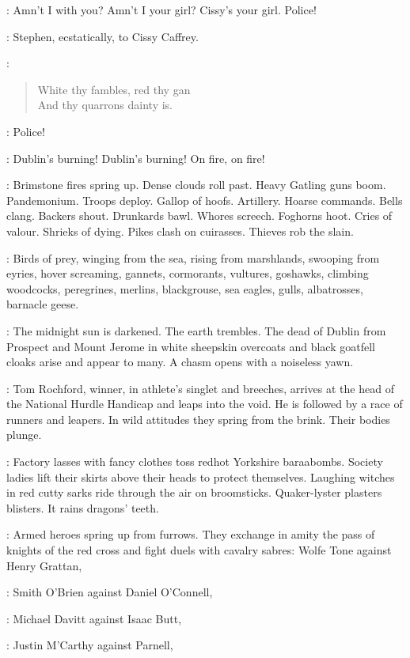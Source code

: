 \Cissy:
Amn't I with you?
Amn't I your girl?
Cissy's your girl.
Police!

:
Stephen, ecstatically, to Cissy Caffrey.

\Stephen:
\begin{verse}
    White thy fambles, red thy gan\\
    And thy quarrons dainty is.
\end{verse}

\Voices:
Police!

\DistantVoices:
Dublin's burning!
Dublin's burning!
On fire, on fire!

:
Brimstone fires spring up.
Dense clouds roll past.
Heavy Gatling guns boom.
Pandemonium.
Troops deploy.
Gallop of hoofs.
Artillery.
Hoarse commands.
Bells clang.
Backers shout.
Drunkards bawl.
Whores screech.
Foghorns hoot.
Cries of valour.
Shrieks of dying.
Pikes clash on cuirasses.
Thieves rob the slain.

:
Birds of prey, winging from the sea,
rising from marshlands, swooping from eyries, hover screaming,
gannets, cormorants, vultures, goshawks, climbing woodcocks, peregrines,
merlins, blackgrouse, sea eagles, gulls, albatrosses, barnacle geese.

:
The midnight sun is darkened.
The earth trembles.
The dead of Dublin from Prospect and Mount Jerome
in white sheepskin overcoats and black goatfell cloaks
arise and appear to many.
A chasm opens with a noiseless yawn.

:
Tom Rochford, winner, in athlete's singlet and breeches,
arrives at the head of the National Hurdle Handicap and leaps into the void.
He is followed by a race of runners and leapers.
In wild attitudes they spring from the brink.
Their bodies plunge.

:
Factory lasses with fancy clothes toss redhot Yorkshire baraabombs.
Society ladies lift their skirts above their heads to protect themselves.
Laughing witches in red cutty sarks ride through the air on broomsticks.
Quaker-lyster plasters blisters.
It rains dragons' teeth.

:
Armed heroes spring up from furrows.
They exchange in amity the pass of knights of the red cross
and fight duels with cavalry sabres:
Wolfe Tone against Henry Grattan,

:
Smith O'Brien against Daniel O'Connell,

:
Michael Davitt against Isaac Butt,

:
Justin M'Carthy against Parnell,

